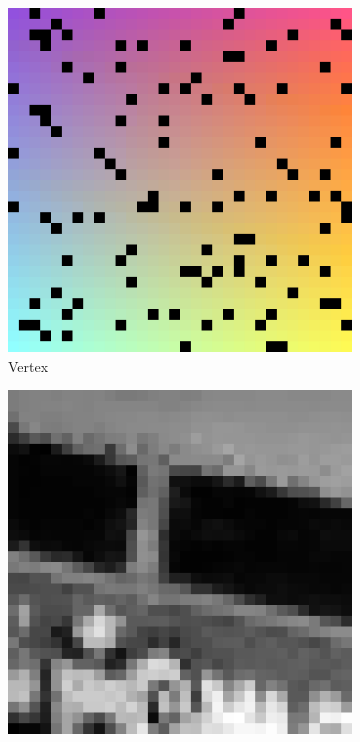 \begin{figure}
	\begin{subfigure}[b]{0.19\linewidth}
		\includegraphics[width=\linewidth]{./Figures/gcnn_synthetic/eval_9_input.png}
		\caption{Vertex}
	\end{subfigure}
	\begin{subfigure}[b]{0.19\linewidth}
	\includegraphics[width=\linewidth]{./Figures/gcnn_synthetic/eval_9_img.png}

\end{subfigure}
\end{figure}
